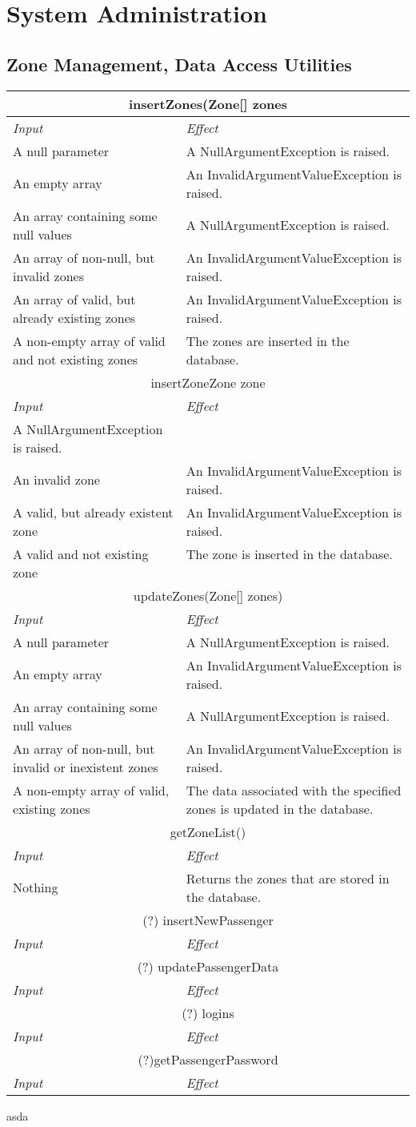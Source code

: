 \documentclass[11pt,oneside,a4paper]{report}
\newcommand{\note}[1]{}
\newcommand{\method}[1]{\multicolumn{2}{|c|}{{#1}}\\\hline
	\textit{Input} & \textit{Effect} \\\hline}
\begin{document}
\chapter{System Administration}
\section{Zone Management, Data Access Utilities}
\begin{tabular}{p{5cm}|p{6cm}}
	\hline
	\method{insertZones(Zone[] zones}
	A null parameter &
	A NullArgumentException is raised.\\\hline
	An empty array &
	An InvalidArgumentValueException is raised.\\\hline
	An array containing some null values &
	A NullArgumentException is raised.\\\hline
	An array of non-null, but invalid zones &
	An InvalidArgumentValueException  is raised. \\\hline
	An array of valid, but already existing zones &
	An InvalidArgumentValueException  is raised. \\\hline
	A non-empty array of valid and not existing zones &
	The zones are inserted in the database. \ \\\hline\hline
	
	\method{insertZone{Zone zone}}
	A NullArgumentException is raised.\\\hline
	An invalid zone &
	An InvalidArgumentValueException  is raised. \\\hline
	A valid, but already existent zone &
	An InvalidArgumentValueException  is raised. \\\hline
	A valid and not existing zone &
	The zone is inserted in the database. \ \\\hline\hline
	
	\method{updateZones(Zone[] zones)}
	A null parameter &
	A NullArgumentException is raised.\\\hline
	An empty array &
	An InvalidArgumentValueException is raised.\\\hline
	An array containing some null values &
	A NullArgumentException is raised.\\\hline
	An array of non-null, but invalid or inexistent zones &
	An InvalidArgumentValueException  is raised. \\\hline
	A non-empty array of valid, existing zones &
	The data associated with the specified zones is updated in the database. \\\hline\hline
	
	\method{getZoneList()}
	Nothing &
	Returns the zones that are stored in the database.  \\\hline\hline
	
	\method{	(?) insertNewPassenger}
	
	\method{	(?) updatePassengerData}
	
	\method{(?) logins}
	
	\method{(?)getPassengerPassword}
	
\end{tabular}
asda\note{Should we add adminId here?}
\end{document}
